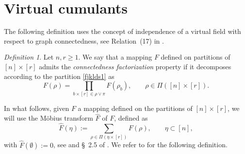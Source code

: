 \documentclass[bj,authoryear,noshowframe]{imsart}
\theoremstyle{plain}
\theoremstyle{remark}
\newtheorem{definition}[theorem]{Definition}
\newcommand{\R}{\mathbb{R}}
\begin{document}
 \vspace{-0.4cm}
 \section{Virtual cumulants} 
 \label{s3}
 \vspace{-0.1cm}
 \noindent
 The following definition
 uses the concept of independence of a virtual field
 with respect to graph connectedness,
 see Relation~(17) in \cite[p.~34]{MalyshevMinlos91}. 
 
 \vspace{-0.2cm}
 
 \begin{definition}
   Let $n,r\geq 1$.
   We say that a mapping $F$ defined on partitions of
   $[n]\times [r]$
   admits the {\it connectedness factorization} property
   if it decomposes according to the partition \eqref{fjklds1} as 
   \begin{equation}
     \label{dia-factoriz}
   F ( \rho ) = \prod_{b \times [r] \in \rho \vee \pi } F ( \rho_b ),  
   \qquad
    \rho \in \Pi ([n]\times [r]). 
 \end{equation}
 \end{definition} 
 
 \vspace{-0.4cm}
 
 \noindent
 In what follows,
 given $F$ a mapping defined on the partitions of
   $[n]\times [r]$, 
   we will use the M\"obius transform
   $\widehat{F}$ of $F$, 
   defined as
 \begin{equation}
 \nonumber %
   \widehat{F}( \eta ):=\sum_{\rho \in \Pi ( \eta \times [r])} F(\rho ),
   \qquad
   \eta \subset [n],
 \end{equation}
 with $\widehat{F}(\emptyset):=0$,
 see \cite{rota1964} %
  and \S~2.5 of \cite{peccatitaqqu}. 
  We refer to \cite[p.~33]{MalyshevMinlos91} for the following definition.
 
\end{document}
